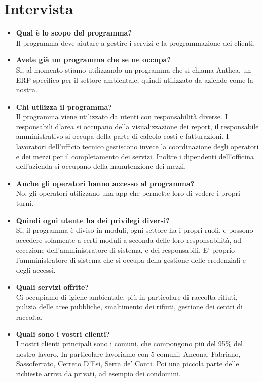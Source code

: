 \documentclass[green, fancy, 11pt]{elegantbook}
\begin{document}
\section{Intervista}
\begin{itemize}
	\item \textbf{Qual è lo scopo del programma?}\\
	Il programma deve aiutare a gestire i servizi e la programmazione dei clienti.
	
	\item \textbf{Avete già un programma che se ne occupa?}\\
	Si, al momento stiamo utilizzando un programma che si chiama Anthea, un ERP specifico per il settore ambientale, quindi utilizzato da aziende come la nostra.
	
	\item \textbf{Chi utilizza il programma?}\\
	Il programma viene utilizzato da utenti con responsabilità diverse. I responsabili d'area si occupano
	della visualizzazione dei report, il responsabile amministrativo si occupa della parte di calcolo costi e fatturazioni. I lavoratori dell'ufficio tecnico gestiscono invece la coordinazione degli operatori e dei mezzi per il completamento dei servizi. Inoltre i dipendenti dell'officina dell'azienda si occupano della manutenzione dei mezzi.
	
	\item \textbf{Anche gli operatori hanno accesso al programma?}\\
	No, gli operatori utilizzano una app che permette loro di vedere i propri turni.
	
	\item \textbf{Quindi ogni utente ha dei privilegi diversi?}\\
	Si, il programma è diviso in moduli, ogni settore ha i propri ruoli, e possono accedere solamente a
	certi moduli a seconda delle loro responsabilità, ad eccezione dell'amministratore di sistema, e dei responsabili.
	E' proprio l'amministratore di sistema che si occupa della gestione delle credenziali e degli accessi.
	
	\item \textbf{Quali servizi offrite?}\\
	Ci occupiamo di igiene ambientale, più in particolare di raccolta rifiuti, pulizia delle aree pubbliche, smaltimento dei rifiuti, gestione dei centri di raccolta.
	
	\item \textbf{Quali sono i vostri clienti?}\\
	I nostri clienti principali sono i comuni, che compongono più del 95\% del nostro lavoro. In particolare lavoriamo
	con 5 comuni: Ancona, Fabriano, Sassoferrato, Cerreto D'Esi, Serra de' Conti. Poi una piccola parte delle richieste
	arriva da privati, ad esempio dei condomini.
	

\end{itemize}
\end{document}
